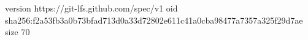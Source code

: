 version https://git-lfs.github.com/spec/v1
oid sha256:f2a53fb3a0b73bfad713d0a33d72802e611c41a0cba98477a7357a325f29d7ae
size 70
